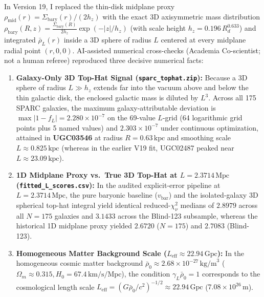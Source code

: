 \documentclass[10pt,a4paper]{article}
\begin{document}
\par
In Version 19, I replaced the thin-disk midplane proxy $\rho_{\text{mid}}(r) = \Sigma_{\text{bary}}(r)/(2h_z)$ with the exact 3D axisymmetric mass distribution $\rho_{\text{bary}}(R,z) = \frac{\Sigma_{\text{bary}}(R)}{2h_z}\exp(-|z|/h_z)$ (with scale height $h_z = 0.196\,R_d^{0.633}$) and integrated $\bar{\rho}_L(r)$ inside a 3D sphere of radius $L$ centered at every midplane radial point $(r,0,0)$. AI-assisted numerical cross-checks (Academia Co-scientist; not a human referee) reproduced three decisive numerical facts:
\begin{enumerate}\setlength{\itemsep}{1pt}\setlength{\parskip}{0pt}\setlength{\topsep}{1pt}
  \item \textbf{Galaxy-Only 3D Top-Hat Signal (\texttt{sparc\_tophat.zip}):} Because a 3D sphere of radius $L \gg h_z$ extends far into the vacuum above and below the thin galactic disk, the enclosed galactic mass is diluted by $L^3$. Across all 175 SPARC galaxies, the maximum galaxy-attributable deviation is $\max |1 - f_L| = 2.280\times 10^{-7}$ on the 69-value $L$-grid (64 logarithmic grid points plus 5 named values) and \textbf{$2.303\times 10^{-7}$} under continuous optimization, attained in \textbf{UGC03546} at radius $R = 0.63\,\text{kpc}$ and smoothing scale $L \approx 0.825\,\text{kpc}$ (whereas in the earlier V19 fit, UGC02487 peaked near $L \approx 23.09\,\text{kpc}$).
  \item \textbf{1D Midplane Proxy vs.\ True 3D Top-Hat at $L = 2.3714\,\text{Mpc}$ (\texttt{fitted\_L\_scores.csv}):} In the audited explicit-error pipeline at $L = 2.3714\,\text{Mpc}$, the pure baryonic baseline ($v_{\text{bar}}$) and the isolated-galaxy 3D spherical top-hat integral yield identical reduced-$\chi^2_\nu$ medians of \textbf{$2.8979$} across all $N=175$ galaxies and \textbf{$3.1433$} across the Blind-123 subsample, whereas the historical 1D midplane proxy yielded $2.6720$ ($N=175$) and $2.7083$ (Blind-123).
  \item \textbf{Homogeneous Matter Background Scale ($L_{\text{eff}} \approx 22.94\,\text{Gpc}$):} In the homogeneous cosmic matter background $\bar{\rho}_0 \approx 2.68\times 10^{-27}\,\text{kg/m}^3$ ($\Omega_m \approx 0.315, H_0 = 67.4\,\text{km/s/Mpc}$), the condition $\gamma_L\bar{\rho}_0 = 1$ corresponds to the cosmological length scale $L_{\text{eff}} = (G\bar{\rho}_0/c^2)^{-1/2} \approx 22.94\,\text{Gpc}$ ($7.08\times 10^{26}\,\text{m}$).
\end{enumerate}
\end{document}
